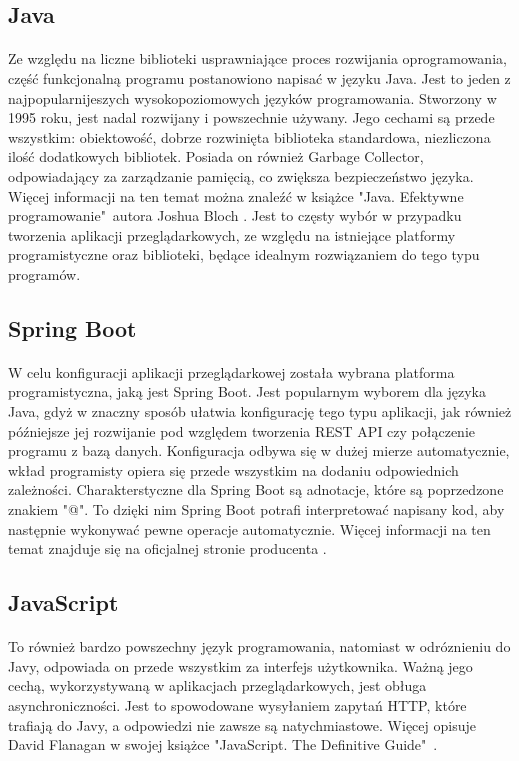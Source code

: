\subsection{Java}
\paragraph{}
Ze względu na liczne biblioteki usprawniające proces rozwijania oprogramowania, część funkcjonalną programu postanowiono napisać w języku Java. Jest to jeden z najpopularnijeszych wysokopoziomowych języków programowania. Stworzony w 1995 roku, jest nadal rozwijany i powszechnie używany. Jego cechami są przede wszystkim: obiektowość, dobrze rozwinięta biblioteka standardowa, niezliczona ilość dodatkowych bibliotek. Posiada on również Garbage Collector, odpowiadający za zarządzanie pamięcią, co zwiększa bezpieczeństwo języka. Więcej informacji na ten temat można znaleźć w książce "Java. Efektywne programowanie"\ autora Joshua Bloch \cite{bib:java}. Jest to częsty wybór w przypadku tworzenia aplikacji przeglądarkowych, ze względu na istniejące platformy programistyczne oraz biblioteki, będące idealnym rozwiązaniem do tego typu programów.

\subsection{Spring Boot}
\paragraph{}
W celu konfiguracji aplikacji przeglądarkowej została wybrana platforma programistyczna, jaką jest Spring Boot. Jest popularnym wyborem dla języka Java, gdyż w znaczny sposób ułatwia konfigurację tego typu aplikacji, jak również późniejsze jej rozwijanie pod względem tworzenia REST API czy połączenie programu z bazą danych. Konfiguracja odbywa się w dużej mierze automatycznie, wkład programisty opiera się przede wszystkim na dodaniu odpowiednich zależności. Charakterstyczne dla Spring Boot są adnotacje, które są poprzedzone znakiem "@". To dzięki nim Spring Boot potrafi interpretować napisany kod, aby następnie wykonywać pewne operacje automatycznie. Więcej informacji na ten temat znajduje się na oficjalnej stronie producenta \cite{bib:spring}.

\subsection{JavaScript}
\paragraph{}
To również bardzo powszechny język programowania, natomiast w odróznieniu do Javy, odpowiada on przede wszystkim za interfejs użytkownika. Ważną jego cechą, wykorzystywaną w aplikacjach przeglądarkowych, jest obługa asynchroniczności. Jest to spowodowane wysyłaniem zapytań HTTP, które trafiają do Javy, a odpowiedzi nie zawsze są natychmiastowe. Więcej opisuje David Flanagan w swojej książce "JavaScript. The Definitive Guide"\ \cite{bib:javascript}.

